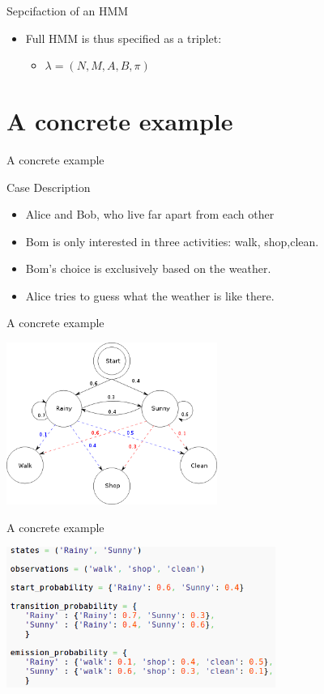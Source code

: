 \documentclass{beamer}
\begin{document}
\begin{frame}{Sepcifaction of an HMM}
\begin{itemize}
\item Full HMM is thus specified as a triplet:
    \begin{itemize}
    \item $\lambda = (N,M,A,B,\pi)$
    \end{itemize}
\end{itemize}
\end{frame}

\section{A concrete example}
\begin{frame}{A concrete example}
    \begin{block}{Case Description}
        \begin{itemize}
        \item Alice and Bob, who live far apart from each other
        \item Bom is only interested in three activities: walk, shop,clean.
        \item Bom's choice is exclusively based on the weather.
        \item Alice tries to guess what the weather is like there.
        \end{itemize}
    \end{block}
\end{frame}

\begin{frame}{A concrete example}
    \begin{center}
    \includegraphics[height=150pt]{400px-HMMGraph.svg.png}
    \end{center}
\end{frame}

\begin{frame}{A concrete example}
    \begin{center}
    \includegraphics[height=130pt]{hmm-python.png}
    \end{center}
\end{frame}
\end{document}
